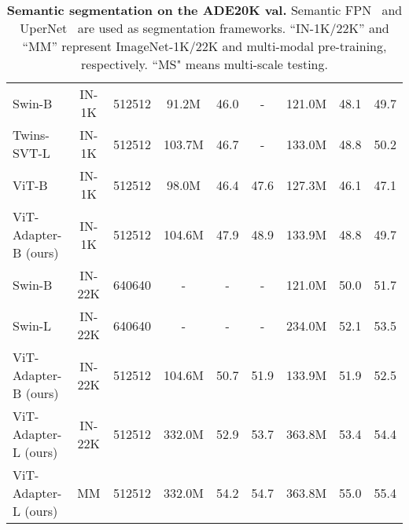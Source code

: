 \documentclass{article} \usepackage{iclr2023_conference,times}
\begin{document}
\begin{table}[t]
{\begin{tabular}{l|c|c|ccc|ccc}
		\midrule
Swin-B \citep{liu2021swin} & IN-1K & 512512 & 91.2M & 46.0 & - & 121.0M & 48.1 & 49.7  \\
Twins-SVT-L \citep{chu2021twins} & IN-1K & 512512 & 103.7M & 46.7 & - & 133.0M & 48.8 & 50.2  \\
ViT-B~\citep{li2021benchmarking} & IN-1K & 512512 & 98.0M & 46.4 & 47.6 & 127.3M & 46.1 & 47.1 \\
\rowcolor{gray!20}
        ViT-Adapter-B (ours) & IN-1K & 512512 & 104.6M & 47.9 & 48.9 & 133.9M & 48.8 & 49.7 \\		
        \midrule
        Swin-B \citep{liu2021swin} & IN-22K & 640640 & - & - & - & 121.0M & 50.0 & 51.7  \\
        Swin-L \citep{liu2021swin} & IN-22K & 640640 & - & - & - & 234.0M & 52.1 & 53.5  \\
        \rowcolor{gray!20}
        ViT-Adapter-B (ours) & IN-22K & 512512 & 104.6M & 50.7 & 51.9 & 133.9M & 51.9 & 52.5 \\
        \rowcolor{gray!20}
        ViT-Adapter-L (ours) & IN-22K & 512512 & 332.0M & 52.9 & 53.7 & 363.8M & 53.4 & 54.4 \\
\rowcolor{yellow!15}
        ViT-Adapter-L (ours) & MM & 512512 & 332.0M & 54.2  & 54.7 & 363.8M & 55.0 & 55.4 \\
        
		\bottomrule
	\end{tabular}}
	\caption{\textbf{Semantic segmentation on the ADE20K val.}
	Semantic FPN~\citep{kirillov2019panoptic} and UperNet~\citep{xiao2018unified} are used as segmentation frameworks.
	``IN-1K/22K'' and ``MM'' represent ImageNet-1K/22K and multi-modal pre-training, respectively.
	``MS" means multi-scale testing.}
	\label{tab:result_ade}
\end{table}
%
 
\end{document}
